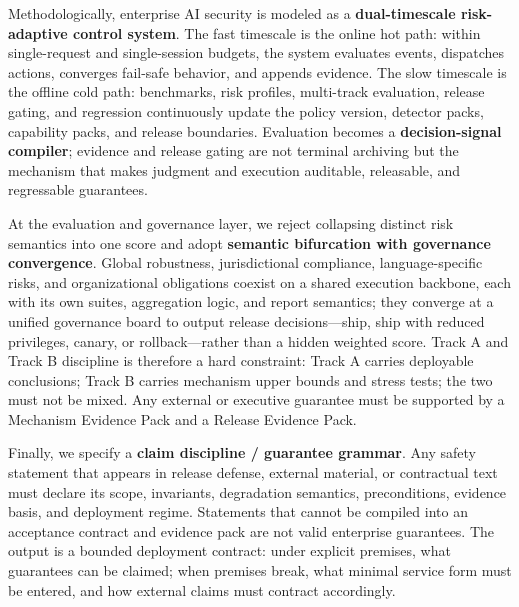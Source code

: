 \documentclass[11pt,a4paper]{report}
\begin{document}
{Methodologically, enterprise AI security is modeled as a \textbf{dual-timescale risk-adaptive control system}. The fast timescale is the online hot path: within single-request and single-session budgets, the system evaluates events, dispatches actions, converges fail-safe behavior, and appends evidence. The slow timescale is the offline cold path: benchmarks, risk profiles, multi-track evaluation, release gating, and regression continuously update the policy version, detector packs, capability packs, and release boundaries. Evaluation becomes a \textbf{decision-signal compiler}; evidence and release gating are not terminal archiving but the mechanism that makes judgment and execution auditable, releasable, and regressable guarantees.

At the evaluation and governance layer, we reject collapsing distinct risk semantics into one score and adopt \textbf{semantic bifurcation with governance convergence}. Global robustness, jurisdictional compliance, language-specific risks, and organizational obligations coexist on a shared execution backbone, each with its own suites, aggregation logic, and report semantics; they converge at a unified governance board to output release decisions—ship, ship with reduced privileges, canary, or rollback—rather than a hidden weighted score. Track A and Track B discipline is therefore a hard constraint: Track A carries deployable conclusions; Track B carries mechanism upper bounds and stress tests; the two must not be mixed. Any external or executive guarantee must be supported by a Mechanism Evidence Pack and a Release Evidence Pack.

Finally, we specify a \textbf{claim discipline / guarantee grammar}. Any safety statement that appears in release defense, external material, or contractual text must declare its scope, invariants, degradation semantics, preconditions, evidence basis, and deployment regime. Statements that cannot be compiled into an acceptance contract and evidence pack are not valid enterprise guarantees. The output is a bounded deployment contract: under explicit premises, what guarantees can be claimed; when premises break, what minimal service form must be entered, and how external claims must contract accordingly.
}
\end{document}
